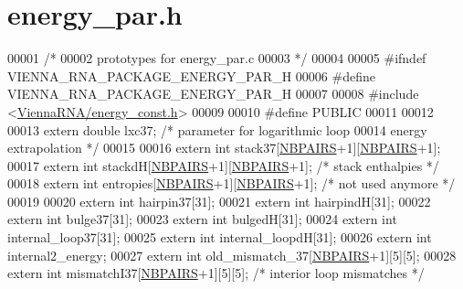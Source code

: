 \hypertarget{energy__par_8h_source}{}\section{energy\+\_\+par.\+h}
\label{energy__par_8h_source}

\begin{DoxyCode}
00001 \textcolor{comment}{/*}
00002 \textcolor{comment}{   prototypes for energy\_par.c}
00003 \textcolor{comment}{*/}
00004 
00005 \textcolor{preprocessor}{#ifndef VIENNA\_RNA\_PACKAGE\_ENERGY\_PAR\_H}
00006 \textcolor{preprocessor}{#define VIENNA\_RNA\_PACKAGE\_ENERGY\_PAR\_H}
00007 
00008 \textcolor{preprocessor}{#include <\hyperlink{energy__const_8h}{ViennaRNA/energy\_const.h}>}
00009 
00010 \textcolor{preprocessor}{#define PUBLIC}
00011 
00012 
00013 \textcolor{keyword}{extern} \textcolor{keywordtype}{double} lxc37;   \textcolor{comment}{/* parameter for logarithmic loop}
00014 \textcolor{comment}{        energy extrapolation            */}
00015 
00016 \textcolor{keyword}{extern} \textcolor{keywordtype}{int} stack37[\hyperlink{energy__const_8h_a5e75221c779d618eab81e096f37e32ce}{NBPAIRS}+1][\hyperlink{energy__const_8h_a5e75221c779d618eab81e096f37e32ce}{NBPAIRS}+1];
00017 \textcolor{keyword}{extern} \textcolor{keywordtype}{int} stackdH[\hyperlink{energy__const_8h_a5e75221c779d618eab81e096f37e32ce}{NBPAIRS}+1][\hyperlink{energy__const_8h_a5e75221c779d618eab81e096f37e32ce}{NBPAIRS}+1]; \textcolor{comment}{/* stack enthalpies */}
00018 \textcolor{keyword}{extern} \textcolor{keywordtype}{int} entropies[\hyperlink{energy__const_8h_a5e75221c779d618eab81e096f37e32ce}{NBPAIRS}+1][\hyperlink{energy__const_8h_a5e75221c779d618eab81e096f37e32ce}{NBPAIRS}+1];  \textcolor{comment}{/* not used anymore */}
00019 
00020 \textcolor{keyword}{extern} \textcolor{keywordtype}{int} hairpin37[31];
00021 \textcolor{keyword}{extern} \textcolor{keywordtype}{int} hairpindH[31];
00022 \textcolor{keyword}{extern} \textcolor{keywordtype}{int} bulge37[31];
00023 \textcolor{keyword}{extern} \textcolor{keywordtype}{int} bulgedH[31];
00024 \textcolor{keyword}{extern} \textcolor{keywordtype}{int} internal\_loop37[31];
00025 \textcolor{keyword}{extern} \textcolor{keywordtype}{int} internal\_loopdH[31];
00026 \textcolor{keyword}{extern} \textcolor{keywordtype}{int} internal2\_energy;
00027 \textcolor{keyword}{extern} \textcolor{keywordtype}{int} old\_mismatch\_37[\hyperlink{energy__const_8h_a5e75221c779d618eab81e096f37e32ce}{NBPAIRS}+1][5][5];
00028 \textcolor{keyword}{extern} \textcolor{keywordtype}{int} mismatchI37[\hyperlink{energy__const_8h_a5e75221c779d618eab81e096f37e32ce}{NBPAIRS}+1][5][5];  \textcolor{comment}{/* interior loop mismatches */}

\end{DoxyCode}
